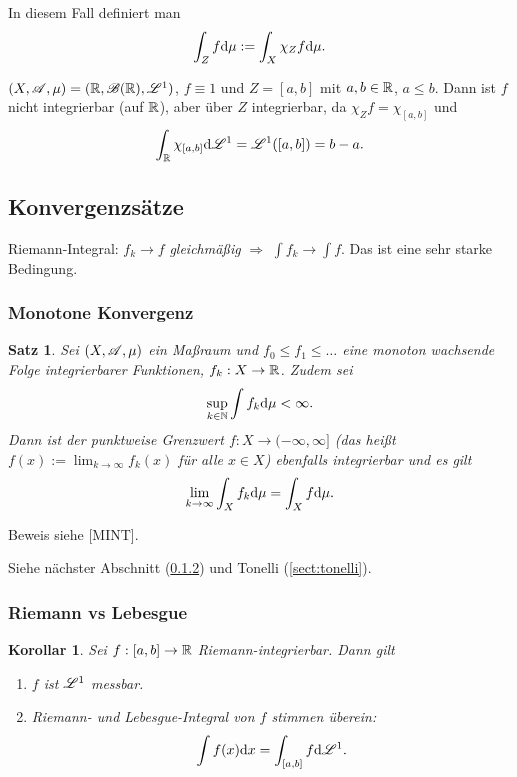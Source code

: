 \documentclass[
 a4paper,
 12pt,
 parskip=half
 ]{scrartcl}
\theoremstyle{plain}
\newtheorem*{thm*}{Satz}
\newtheorem*{kor}{Korollar}
\theoremstyle{definition}
\numberwithin{equation}{section}
\begin{document}
 In diesem Fall definiert man
 \[ \int_Z f \mathrm{d} \mu := \int_X \chi_Z f \mathrm{d} \mu. \]

\begin{bsp}
 $(X,\mathscr{A},\mu) = (\mathbb{R}, \mathscr{B}(\mathbb{R}), \mathscr{L}^1 )$, $f \equiv 1$ und $Z = [a,b]$ mit $a,b \in \mathbb{R}$, $a \le b$. Dann ist $f$ nicht integrierbar (auf $\mathbb{R}$), aber über $Z$ integrierbar, da $\chi_Z f = \chi_{[a,b]}$ und
 \[ \int_{\mathbb{R}} \chi_{[a,b]} \mathrm{d} \mathscr{L}^1 = \mathscr{L}^1( [a,b] ) = b - a. \]
\end{bsp}
 
\subsection{Konvergenzsätze}
 Riemann-Integral: $f_k \to f$ \emph{gleichmäßig} $\Rightarrow$ $\int f_k \to \int f$. Das ist eine sehr starke Bedingung.
 
\subsubsection{Monotone Konvergenz}
\begin{thm*}
 Sei $(X,\mathscr{A},\mu)$ ein Maßraum und $f_0 \le f_1 \le \ldots$ eine monoton wachsende Folge integrierbarer Funktionen, $f_k : X \to \mathbb{R}$. Zudem sei
 \[ \sup_{k \in \mathbb{N}} \int f_k \mathrm{d} \mu < \infty. \]
 Dann ist der \emph{punktweise} Grenzwert $f: X \to (-\infty, \infty]$ (das heißt $f(x) := \lim_{k \to \infty} f_k(x)$ für alle $x \in X$) ebenfalls integrierbar und es gilt
 \[ \lim_{k \to \infty} \int_X f_k \mathrm{d} \mu = \int_X f \mathrm{d} \mu. \]
\end{thm*}

Beweis siehe [MINT].

\begin{bsp}
 Siehe nächster Abschnitt (\ref{sect:riemann-lebesgue}) und Tonelli (\ref{sect:tonelli}).
\end{bsp}

\subsubsection{Riemann vs Lebesgue}\label{sect:riemann-lebesgue}
\begin{kor}
 Sei $f:[a,b] \to \mathbb{R}$ Riemann-integrierbar. Dann gilt
 \begin{enumerate}
  \item $f$ ist $\mathscr{L}^1$ messbar.
  \item Riemann- und Lebesgue-Integral von $f$ stimmen überein:
   \[ \int f(x) \mathrm{d} x = \int_{[a,b]} f \mathrm{d} \mathscr{L}^1. \]
 \end{enumerate}
\end{kor}
\end{document}
